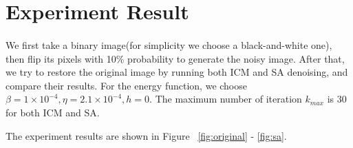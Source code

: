 \documentclass{article}
\begin{document}
\section{Experiment Result}

\paragraph{}
We first take a binary image(for simplicity we choose a black-and-white one), then flip its pixels with 10\% probability to generate the noisy image. After that, we try to restore the original image by running both ICM and SA denoising, and compare their results. For the energy function, we choose $\beta = 1 \times 10^{-4}, \eta = 2.1 \times 10^{-4}, h = 0$. The maximum number of iteration $k_{max}$ is $30$ for both ICM and SA.

The experiment results are shown in Figure ~\ref{fig:original} - \ref{fig:sa}.
\end{document}
